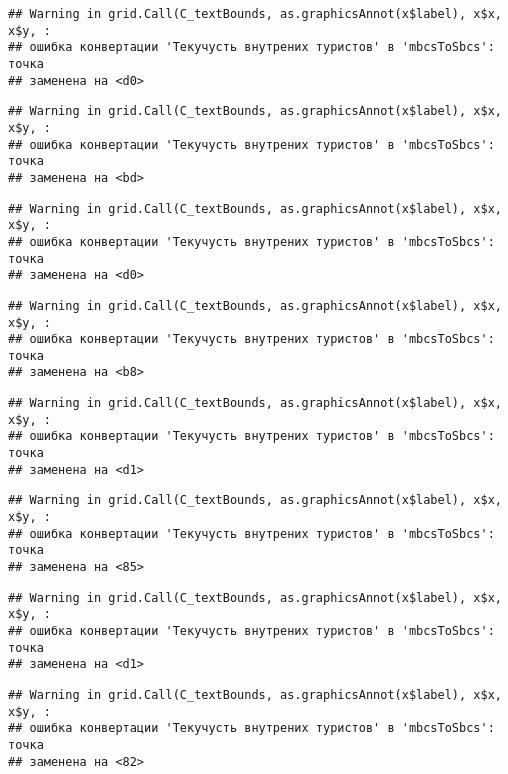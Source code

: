 \documentclass[
]{article}
\begin{document}
\begin{verbatim}
## Warning in grid.Call(C_textBounds, as.graphicsAnnot(x$label), x$x, x$y, :
## ошибка конвертации 'Текучусть внутрених туристов' в 'mbcsToSbcs': точка
## заменена на <d0>
\end{verbatim}

\begin{verbatim}
## Warning in grid.Call(C_textBounds, as.graphicsAnnot(x$label), x$x, x$y, :
## ошибка конвертации 'Текучусть внутрених туристов' в 'mbcsToSbcs': точка
## заменена на <bd>
\end{verbatim}

\begin{verbatim}
## Warning in grid.Call(C_textBounds, as.graphicsAnnot(x$label), x$x, x$y, :
## ошибка конвертации 'Текучусть внутрених туристов' в 'mbcsToSbcs': точка
## заменена на <d0>
\end{verbatim}

\begin{verbatim}
## Warning in grid.Call(C_textBounds, as.graphicsAnnot(x$label), x$x, x$y, :
## ошибка конвертации 'Текучусть внутрених туристов' в 'mbcsToSbcs': точка
## заменена на <b8>
\end{verbatim}

\begin{verbatim}
## Warning in grid.Call(C_textBounds, as.graphicsAnnot(x$label), x$x, x$y, :
## ошибка конвертации 'Текучусть внутрених туристов' в 'mbcsToSbcs': точка
## заменена на <d1>
\end{verbatim}

\begin{verbatim}
## Warning in grid.Call(C_textBounds, as.graphicsAnnot(x$label), x$x, x$y, :
## ошибка конвертации 'Текучусть внутрених туристов' в 'mbcsToSbcs': точка
## заменена на <85>
\end{verbatim}

\begin{verbatim}
## Warning in grid.Call(C_textBounds, as.graphicsAnnot(x$label), x$x, x$y, :
## ошибка конвертации 'Текучусть внутрених туристов' в 'mbcsToSbcs': точка
## заменена на <d1>
\end{verbatim}

\begin{verbatim}
## Warning in grid.Call(C_textBounds, as.graphicsAnnot(x$label), x$x, x$y, :
## ошибка конвертации 'Текучусть внутрених туристов' в 'mbcsToSbcs': точка
## заменена на <82>
\end{verbatim}
\end{document}
